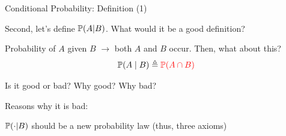 \documentclass[fleqn,aspectratio=169]{beamer}
\begin{document}
\begin{frame}{Conditional Probability: Definition (1)}

\plitemsep 0.1in
\bci 

\item<1-> Second, let's define $\mathbb{P}( A | B )$. What would it be a good definition?

\item<2-> Probability of $A$ given $B$ $\rightarrow$ both $A$ and $B$ occur. Then, what about this?
$$
\mathbb{P}( A \mid B ) \triangleq {\color{red} \mathbb{P}( A \cap B )}
$$

\item<3-> Is it good or bad? Why good? Why bad?

\item<4-> Reasons why it is bad: 

\bci
\item $\mathbb{P}( \cdot | B )$ should be a new probability law (thus, three axioms)
\eci


\medskip



\eci 

\end{frame}
\end{document}
